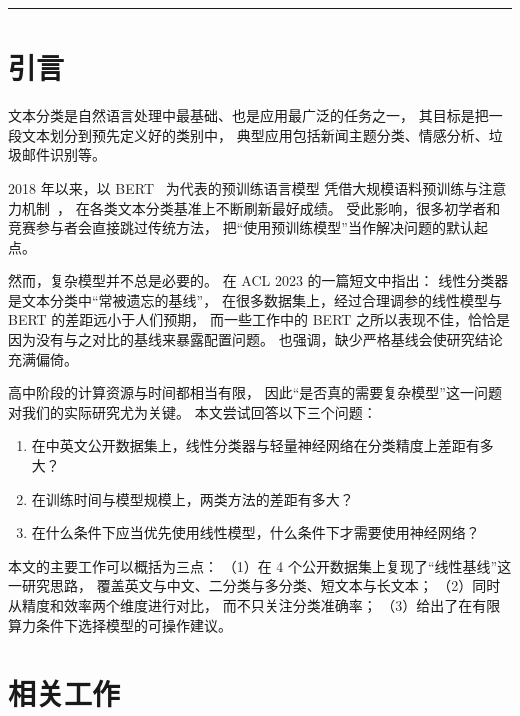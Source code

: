 \documentclass[11pt, a4paper]{ctexart}
\begin{document}
\vspace{0.8em}
\hrule
\vspace{0.4em}

\section{引言}

文本分类是自然语言处理中最基础、也是应用最广泛的任务之一，
其目标是把一段文本划分到预先定义好的类别中，
典型应用包括新闻主题分类、情感分析、垃圾邮件识别等。

2018 年以来，以 BERT~\citep{devlin2019bert} 为代表的预训练语言模型
凭借大规模语料预训练与注意力机制~\citep{vaswani2017attention}，
在各类文本分类基准上不断刷新最好成绩。
受此影响，很多初学者和竞赛参与者会直接跳过传统方法，
把“使用预训练模型”当作解决问题的默认起点。

然而，复杂模型并不总是必要的。
\citet{lin2023linear} 在 ACL 2023 的一篇短文中指出：
线性分类器是文本分类中“常被遗忘的基线”，
在很多数据集上，经过合理调参的线性模型与 BERT 的差距远小于人们预期，
而一些工作中的 BERT 之所以表现不佳，恰恰是因为没有与之对比的基线来暴露配置问题。
\citet{sculley2018winner} 也强调，缺少严格基线会使研究结论充满偏倚。

高中阶段的计算资源与时间都相当有限，
因此“是否真的需要复杂模型”这一问题对我们的实际研究尤为关键。
本文尝试回答以下三个问题：
\begin{enumerate}[label=(\arabic*)]
  \item 在中英文公开数据集上，线性分类器与轻量神经网络在分类精度上差距有多大？
  \item 在训练时间与模型规模上，两类方法的差距有多大？
  \item 在什么条件下应当优先使用线性模型，什么条件下才需要使用神经网络？
\end{enumerate}

本文的主要工作可以概括为三点：
（1）在 4 个公开数据集上复现了“线性基线”这一研究思路，
覆盖英文与中文、二分类与多分类、短文本与长文本；
（2）同时从精度和效率两个维度进行对比，
而不只关注分类准确率；
（3）给出了在有限算力条件下选择模型的可操作建议。

\section{相关工作}
\end{document}
